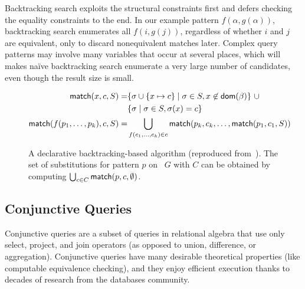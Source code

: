 Backtracking search exploits the structural constraints first and defers
 checking the equality constraints to the end.
In our example pattern $f(\alpha, g(\alpha))$,
 backtracking search enumerates all $f(i, g(j))$,
 regardless of whether $i$ and $j$ are equivalent,
 only to discard nonequivalent matches later.
Complex query patterns may involve many variables
 that occur at several places, which will makes na\"ive backtracking search
 enumerate a very large number of candidates,
 even though the result size is small.

\def\match{{\sf match}} \def\class{{\sf class}} \def\find{{\sf find}}
\def\dom{{\sf dom}}
\begin{figure}
  \begin{align*}
    \match(x,c,S) = & \{ \sigma \cup \{ x \mapsto c\} \mid \sigma \in S, x \not \in \dom(\beta)\}\ \cup\\
                    & \{ \sigma \mid \sigma \in S, \sigma(x) = c \}\\
    \match(f(p_{1}, \dots, p_{k}), c, S) = & \bigcup_{f(c_{1},\dots,c_{k})\in c}
                                             \match(p_{k}, c_{k}, \dots, \match(p_{1}, c_{1}, S))
  \end{align*}
  \caption{A declarative backtracking-based \ematching{} algorithm (reproduced
    from~\citet{efficient-ematching}). The set of substitutions for pattern $p$
    on \egraph~$G$ with \eclasses $C$ can be obtained by computing $\bigcup_{c\in C}\match(p, c, \emptyset)$.
  }\label{alg:backtrack}
\end{figure}

\subsection{Conjunctive Queries}

Conjunctive queries are a subset of queries in relational algebra
 that use only select, project, and join operators
(as opposed to union, difference, or aggregation).
Conjunctive queries have many desirable theoretical properties
 (like computable equivalence checking),
 and they enjoy efficient execution
 thanks to decades of research from the databases community.

